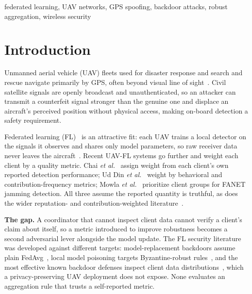 \documentclass[conference]{IEEEtran}
\begin{document}
\begin{IEEEkeywords}
federated learning, UAV networks, GPS spoofing, backdoor attacks, robust aggregation, wireless security
\end{IEEEkeywords}

\section{Introduction}

Unmanned aerial vehicle (UAV) fleets used for disaster response and search and
rescue navigate primarily by GPS, often beyond visual line of sight~\cite{mekdad2023survey}. Civil satellite signals are openly broadcast and
unauthenticated, so an attacker can transmit a counterfeit signal stronger than
the genuine one and displace an aircraft's perceived position without physical
access, making on-board detection a safety requirement.

Federated learning (FL)~\cite{mcmahan2017communication} is an attractive fit:
each UAV trains a local detector on the signals it observes and shares only
model parameters, so raw receiver data never leaves the
aircraft~\cite{udin2025federated}. Recent UAV-FL systems go further and weight
each client by a quality metric. Chai \emph{et al.}~\cite{chai2025navigation}
assign weight from each client's own reported detection performance; Ud Din
\emph{et al.}~\cite{udin2025federated} weight by behavioral and
contribution-frequency metrics; Mowla \emph{et al.}~\cite{mowla2020federated}
prioritize client groups for FANET jamming detection. All three assume the
reported quantity is truthful, as does the wider reputation- and
contribution-weighted literature~\cite{kang2019incentive,kairouz2021advances}.

\textbf{The gap.} A coordinator that cannot inspect client data cannot verify a
client's claim about itself, so a metric introduced to improve robustness
becomes a second adversarial lever alongside the model update. The FL security
literature was developed against different targets: model-replacement backdoors
assume plain FedAvg~\cite{bagdasaryan2020backdoor}, local model poisoning
targets Byzantine-robust
rules~\cite{fang2020local,blanchard2017machine,yin2018byzantine}, and the most
effective known backdoor defenses inspect client data
distributions~\cite{nguyen2024backdoor,mothukuri2021survey}, which a
privacy-preserving UAV deployment does not expose. None evaluates an
aggregation rule that trusts a self-reported metric.
\end{document}

